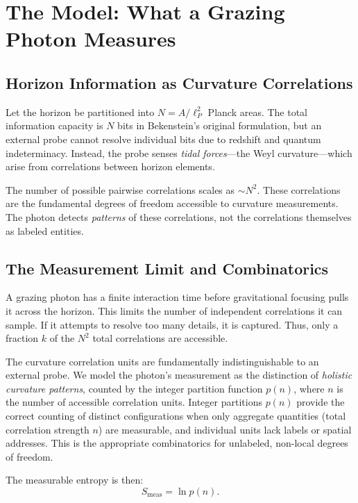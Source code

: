 \documentclass[12pt, letterpaper]{article}
\begin{document}
\section{The Model: What a Grazing Photon Measures}

\subsection{Horizon Information as Curvature Correlations}

Let the horizon be partitioned into $N = A/\ell_P^2$ Planck areas. The total information capacity is $N$ bits in Bekenstein's original formulation, but an external probe cannot resolve individual bits due to redshift and quantum indeterminacy. Instead, the probe senses \emph{tidal forces}—the Weyl curvature—which arise from correlations between horizon elements.

The number of possible pairwise correlations scales as $\sim N^2$. These correlations are the fundamental degrees of freedom accessible to curvature measurements. The photon detects \emph{patterns} of these correlations, not the correlations themselves as labeled entities.

\subsection{The Measurement Limit and Combinatorics}

A grazing photon has a finite interaction time before gravitational focusing pulls it across the horizon. This limits the number of independent correlations it can sample. If it attempts to resolve too many details, it is captured. Thus, only a fraction $k$ of the $N^2$ total correlations are accessible.

The curvature correlation units are fundamentally indistinguishable to an external probe. We model the photon's measurement as the distinction of \emph{holistic curvature patterns}, counted by the integer partition function $p(n)$, where $n$ is the number of accessible correlation units. Integer partitions $p(n)$ provide the correct counting of distinct configurations when only aggregate quantities (total correlation strength $n$) are measurable, and individual units lack labels or spatial addresses. This is the appropriate combinatorics for unlabeled, non-local degrees of freedom.

The measurable entropy is then:
\begin{equation}
S_{\mathrm{meas}} = \ln p(n).
\label{eq:meas-entropy}
\end{equation}
\end{document}
